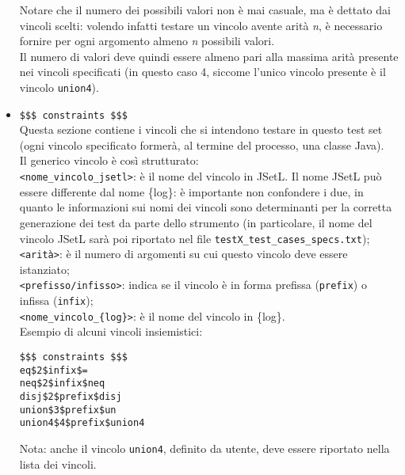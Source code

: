 \begin{itemize}
Notare che il numero dei possibili valori non è mai casuale, ma è dettato dai vincoli scelti: volendo infatti testare un vincolo avente arità \textit{n}, è necessario fornire per ogni argomento almeno \textit{n} possibili valori. \\
Il numero di valori deve quindi essere almeno pari alla massima arità presente nei vincoli specificati (in questo caso 4, siccome l'unico vincolo presente è il vincolo \texttt{union4}).

\item \texttt{\$\$\$ constraints \$\$\$} \\
Questa sezione contiene i vincoli che si intendono testare in questo test set (ogni vincolo specificato formerà, al termine del processo, una classe Java).\\
Il generico vincolo è così strutturato:\\

\texttt{<nome\_vincolo\_jsetl>}: è il nome del vincolo in JSetL. Il nome JSetL può essere differente dal nome \{log\}: è importante non confondere i due, in quanto le informazioni sui nomi dei vincoli sono determinanti per la corretta generazione dei test da parte dello strumento (in particolare, il nome del vincolo JSetL sarà poi riportato nel file \texttt{testX\_test\_cases\_specs.txt});\\

\texttt{<arità>}: è il numero di argomenti su cui questo vincolo deve essere istanziato;\\

\texttt{<prefisso/infisso>}: indica se il vincolo è in forma prefissa (\texttt{prefix}) o infissa (\texttt{infix});\\

\texttt{<nome\_vincolo\_\{log\}>}: è il nome del vincolo in \{log\}.\\

Esempio di alcuni vincoli insiemistici:
\begin{lstlisting}
$$$ constraints $$$
eq$2$infix$=
neq$2$infix$neq
disj$2$prefix$disj
union$3$prefix$un
union4$4$prefix$union4
\end{lstlisting}

Nota: anche il vincolo \texttt{union4}, definito da utente, deve essere riportato nella lista dei vincoli.\\

\end{itemize}

